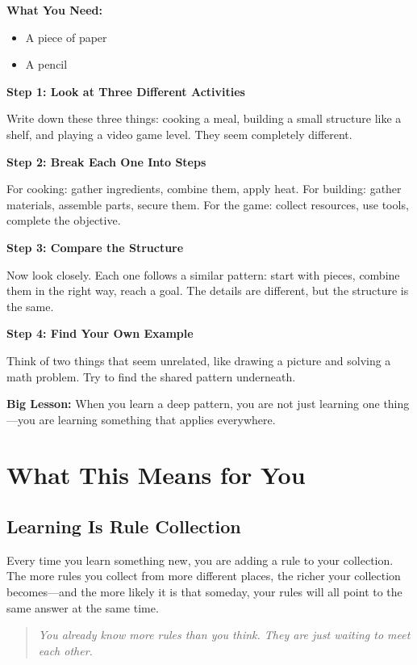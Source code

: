 \documentclass[12pt]{book}
\begin{document}
\textbf{What You Need:}
\begin{itemize}
  \item A piece of paper
  \item A pencil
\end{itemize}

\textbf{Step 1: Look at Three Different Activities}

Write down these three things: cooking a meal, building a small structure
like a shelf, and playing a video game level. They seem completely different.

\textbf{Step 2: Break Each One Into Steps}

For cooking: gather ingredients, combine them, apply heat.
For building: gather materials, assemble parts, secure them.
For the game: collect resources, use tools, complete the objective.

\textbf{Step 3: Compare the Structure}

Now look closely. Each one follows a similar pattern: start with pieces,
combine them in the right way, reach a goal. The details are different,
but the structure is the same.

\textbf{Step 4: Find Your Own Example}

Think of two things that seem unrelated, like drawing a picture and solving
a math problem. Try to find the shared pattern underneath.

\textbf{Big Lesson:} When you learn a deep pattern, you are not just
learning one thing---you are learning something that applies everywhere.

\chapter{What This Means for You}

\section{Learning Is Rule Collection}

Every time you learn something new, you are adding a rule to your collection.
The more rules you collect from more different places, the richer your
collection becomes---and the more likely it is that someday, your rules will
all point to the same answer at the same time.

\begin{quote}\itshape
You already know more rules than you think.
They are just waiting to meet each other.
\end{quote}
\end{document}
